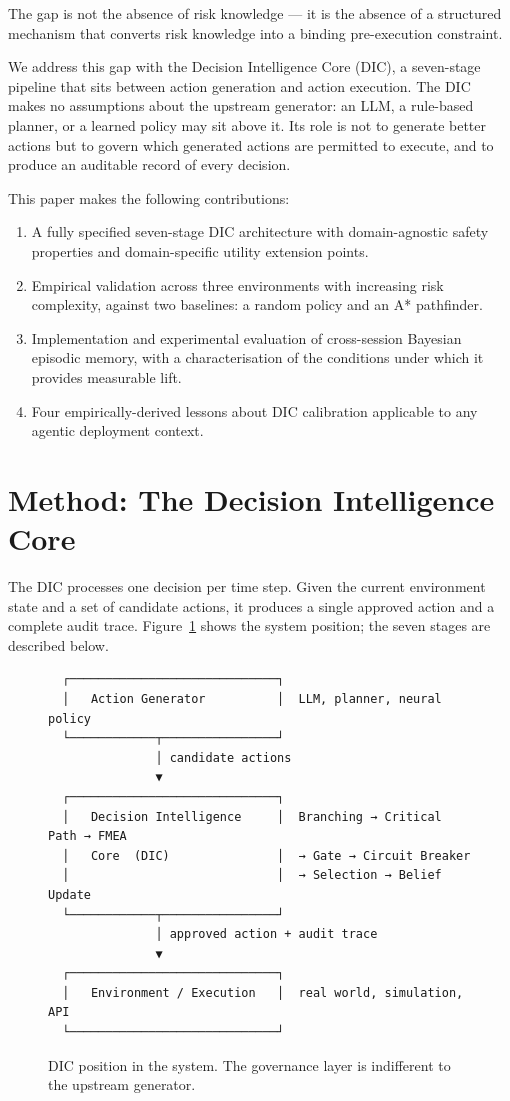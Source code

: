 \documentclass[11pt,letterpaper]{article}
\begin{document}
The gap is not the absence of risk knowledge --- it is the absence of a structured
mechanism that converts risk knowledge into a binding pre-execution constraint.

We address this gap with the Decision Intelligence Core (DIC), a seven-stage
pipeline that sits between action generation and action execution. The DIC makes
no assumptions about the upstream generator: an LLM, a rule-based planner, or a
learned policy may sit above it. Its role is not to generate better actions but
to govern which generated actions are permitted to execute, and to produce an
auditable record of every decision.

This paper makes the following contributions:
\begin{enumerate}[leftmargin=*, nosep]
  \item A fully specified seven-stage DIC architecture with domain-agnostic
        safety properties and domain-specific utility extension points.
  \item Empirical validation across three environments with increasing risk
        complexity, against two baselines: a random policy and an A* pathfinder.
  \item Implementation and experimental evaluation of cross-session Bayesian
        episodic memory, with a characterisation of the conditions under which
        it provides measurable lift.
  \item Four empirically-derived lessons about DIC calibration applicable to
        any agentic deployment context.
\end{enumerate}

\section{Method: The Decision Intelligence Core}
\label{sec:method}

The DIC processes one decision per time step. Given the current environment state
and a set of candidate actions, it produces a single approved action and a complete
audit trace. Figure~\ref{fig:architecture} shows the system position; the seven
stages are described below.

\begin{figure}[H]
\centering
\begin{verbatim}
  ┌─────────────────────────────┐
  │   Action Generator          │  LLM, planner, neural policy
  └────────────┬────────────────┘
               │ candidate actions
               ▼
  ┌─────────────────────────────┐
  │   Decision Intelligence     │  Branching → Critical Path → FMEA
  │   Core  (DIC)               │  → Gate → Circuit Breaker
  │                             │  → Selection → Belief Update
  └────────────┬────────────────┘
               │ approved action + audit trace
               ▼
  ┌─────────────────────────────┐
  │   Environment / Execution   │  real world, simulation, API
  └─────────────────────────────┘
\end{verbatim}
\caption{DIC position in the system. The governance layer is indifferent to
the upstream generator.}
\label{fig:architecture}
\end{figure}
\end{document}
